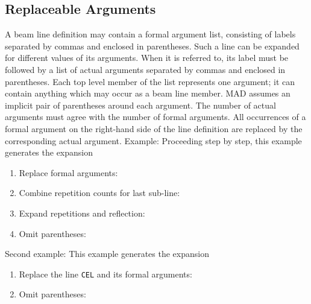 \subsection{Replaceable Arguments}
A beam line definition may contain a formal argument list,
consisting of labels separated by commas and enclosed in parentheses.
Such a line can be expanded for different values of its arguments.
When it is referred to,
its label must be followed by a list of actual arguments
separated by commas and enclosed in parentheses.
Each top level member of the list represents one argument;
it can contain anything which may occur as a beam line member.
MAD assumes an implicit pair of parentheses around each argument.
The number of actual arguments must agree with the number
of formal arguments.
All occurrences of a formal argument on the right-hand side of the
line definition are replaced by the corresponding actual argument.
Example:
Proceeding step by step, this example generates the expansion
\begin{enumerate}
\item Replace formal arguments:
\item Combine repetition counts for last sub-line:
\item Expand repetitions and reflection:
\item Omit parentheses:
\end{enumerate}
Second example:
This example generates the expansion
\begin{enumerate}
\item Replace the line {\tt CEL} and its formal arguments:
\item Omit parentheses:
\end{enumerate}
 
